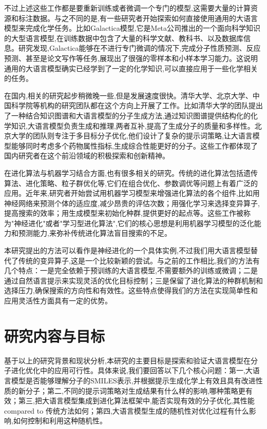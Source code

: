 不过上述这些工作都是要重新训练或者微调一个专门的模型,这需要大量的计算资源和标注数据。与之不同的是,有一些研究者开始探索如何直接使用通用的大语言模型来完成化学任务。比如Galactica模型,它是Meta公司推出的一个面向科学知识的大型语言模型,在训练数据中包含了大量的科学文献、教科书、以及数据库信息。研究发现,Galactica能够在不进行专门微调的情况下,完成分子性质预测、反应预测、甚至是论文写作等任务,展现出了很强的零样本和小样本学习能力。这说明通用的大语言模型确实已经学到了一定的化学知识,可以直接应用于一些化学相关的任务。

在国内,相关的研究起步稍微晚一些,但是发展速度很快。清华大学、北京大学、中国科学院等机构的研究团队都在这个方向上开展了工作。比如清华大学的团队提出了一种结合知识图谱和大语言模型的分子生成方法,通过知识图谱提供结构化的化学知识,大语言模型负责生成和推理,两者互补,提高了生成分子的质量和多样性。北京大学的团队则专注于多目标分子优化,他们设计了复杂的提示词策略,让大语言模型能够同时考虑多个药物属性指标,生成综合性能更好的分子。这些工作都体现了国内研究者在这个前沿领域的积极探索和创新精神。

在进化算法与机器学习结合方面,也有很多相关的研究。传统的进化算法包括遗传算法、进化策略、粒子群优化等,它们在组合优化、参数调优等问题上有着广泛的应用。近年来,研究者开始尝试用机器学习模型来增强进化算法的各个组件,比如用神经网络来预测个体的适应度,减少昂贵的评估次数；用强化学习来选择变异算子,提高搜索的效率；用生成模型来初始化种群,提供更好的起点等。这些工作被称为"神经进化"或者"学习型进化算法",它们的核心思想是利用机器学习模型的泛化能力和预测能力,来弥补传统进化算法盲目搜索的不足。

本研究提出的方法可以看作是神经进化的一个具体实例,不过我们用大语言模型替代了传统的变异算子,这是一个比较新颖的尝试。与之前的工作相比,我们的方法有几个特点：一是完全依赖于预训练的大语言模型,不需要额外的训练或微调；二是通过自然语言提示来实现灵活的优化目标控制；三是保留了进化算法的种群机制和选择压力,确保搜索的方向性和有效性。这些特点使得我们的方法在实现简单性和应用灵活性方面具有一定的优势。

\section{研究内容与目标}

基于以上的研究背景和现状分析,本研究的主要目标是探索和验证大语言模型在分子进化优化中的应用可行性。具体来说,我们要回答以下几个核心问题：第一,大语言模型是否能够理解分子的SMILES表示,并根据提示生成化学上有效且具有改进性质的新分子；第二,不同的提示词策略对生成结果有什么样的影响,哪种策略更有效；第三,把大语言模型集成到进化算法框架中,能否实现有效的分子优化,其性能 compared to 传统方法如何；第四,大语言模型生成的随机性对优化过程有什么影响,如何控制和利用这种随机性。

